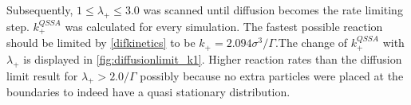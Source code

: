 \documentclass[
  a4paper,BCOR10mm,twoside,
  headsepline,footsepline,%
  fleqn,openbib
]{scrbook}
\begin{document}
Subsequently,  $1\leq\lambda_+\leq3.0$ was scanned until diffusion becomes the rate limiting step. $k^{QSSA}_{+}$ was calculated for every simulation. The fastest possible reaction should be limited by \cref{difkinetics} to be $k_+=2.094 \sigma^3/\Gamma$.The change of $k^{QSSA}_{+}$ with $\lambda_+$ is displayed in \cref{fig:diffusionlimit_k1}. Higher reaction rates than the diffusion limit  result for $\lambda_+>2.0 /\Gamma$ possibly because no extra particles were placed at the boundaries to indeed have a quasi stationary distribution. 

 \newpage
\end{document}
